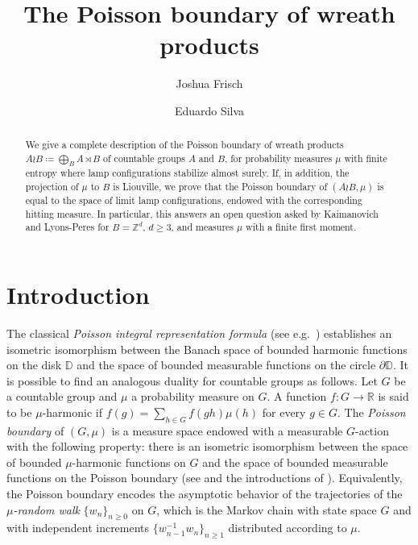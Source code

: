 \documentclass[reqno,oneside,11pt]{amsart}
\author{Joshua Frisch}
\author{Eduardo Silva}
\title[The Poisson boundary of wreath products]{The Poisson boundary of wreath products}
\newcommand{\Z}{\mathbb{Z}}
\newcommand{\R}{\mathbb{R}}
\theoremstyle{plain}
\theoremstyle{definition}
\begin{document}
	
	\maketitle
	\begin{abstract} 
		We give a complete description of the Poisson boundary of wreath products $A\wr B\coloneqq \bigoplus_{B} A\rtimes B$  of countable groups $A$ and $B$, for probability measures $\mu$ with finite entropy where lamp configurations stabilize almost surely. If, in addition, the projection of $\mu$ to $B$ is Liouville, we prove that the Poisson boundary of $(A\wr B,\mu)$ is equal to the space of limit lamp configurations, endowed with the corresponding hitting measure. In particular, this answers an open question asked by Kaimanovich \cite{Kaimanovich2001} and Lyons-Peres \cite{LyonsPeres2021} for $B=\Z^d$, $d\ge 3$, and measures $\mu$ with a finite first moment.
	\end{abstract}
\section{Introduction}\label{introduction}
The classical \emph{Poisson integral representation formula} (see e.g.\ \cite[Theorems 4.22 and 4.23]{Ahlfors1978}) establishes an isometric isomorphism between the Banach space of bounded harmonic functions on the disk $\mathbb{D}$ and the space of bounded measurable functions on the circle $\partial \mathbb{D}$. It is possible to find an analogous duality for countable groups as follows. Let $G$ be a countable group and $\mu$ a probability measure on $G$. A function $f:G\to \R$ is said to be $\mu$-harmonic if $f(g)=\sum_{h\in G}f(gh)\mu(h)$ for every $g\in G$. The \emph{Poisson boundary} of $(G,\mu)$ is a measure space endowed with a measurable $G$-action with the following property: there is an isometric isomorphism between the space of bounded $\mu$-harmonic functions on $G$ and the space of bounded measurable functions on the Poisson boundary (see \cite[Theorem 3.1]{Furstenberg1971} and the introductions of \cite{KaimanovcihVershik1983,Kaimanovich2000}). Equivalently, the Poisson boundary encodes the asymptotic behavior of the trajectories of the \emph{$\mu$-random walk} $\{w_n\}_{n\ge 0}$ on $G$, which is the Markov chain with state space $G$ and with independent increments $\{w_{n-1}^{-1}w_n\}_{n\ge 1}$ distributed according to $\mu$. 
\end{document}
